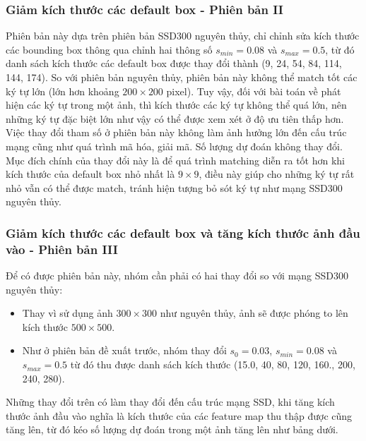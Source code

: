 \documentclass[a4paper,12pt]{article}
\begin{document}
	\subsubsection{Giảm kích thước các default box - Phiên bản II}
	
	Phiên bản này dựa trên phiên bản SSD300 nguyên thủy\cite{liu2016ssd}, chỉ chỉnh sửa kích thước các bounding box thông qua chỉnh hai thông số $s_{min} = 0.08$ và $s_{max} = 0.5$, từ đó danh sách kích thước các default box được thay đổi thành (9, 24, 54, 84, 114, 144, 174). So với phiên bản nguyên thủy, phiên bản này không thể match tốt các ký tự lớn (lớn hơn khoảng $200 \times 200$ pixel). Tuy vậy, đối với bài toán về phát hiện các ký tự trong một ảnh, thì kích thước các ký tự không thể quá lớn, nên những ký tự đặc biệt lớn như vậy có thể được xem xét ở độ ưu tiên thấp hơn.\\
	Việc thay đổi tham số ở phiên bản này không làm ảnh hưởng lớn đến cấu trúc mạng cũng như quá trình mã hóa, giải mã. Số lượng dự đoán không thay đổi.\\
	Mục đích chính của thay đổi này là để quá trình matching diễn ra tốt hơn khi kích thước của default box nhỏ nhất là $9 \times 9$, điều này giúp cho những ký tự rất nhỏ vẫn có thể được match, tránh hiện tượng bỏ sót ký tự như mạng SSD300 nguyên thủy\cite{liu2016ssd}.
	
	\subsubsection{Giảm kích thước các default box và tăng kích thước ảnh đầu vào - Phiên bản III}
	
	Để có được phiên bản này, nhóm cần phải có hai thay đổi so với mạng SSD300 nguyên thủy\cite{liu2016ssd}:
	\begin{itemize}
		\item Thay vì sử dụng ảnh $300 \times 300$ như nguyên thủy, ảnh sẽ được phóng to lên kích thước $500 \times 500$.
		\item Như ở phiên bản đề xuất trước, nhóm thay đổi $s_0 = 0.03$, $s_{min} = 0.08$ và $s_{max} = 0.5$ từ đó thu được danh sách kích thước (15.0, 40, 80, 120, 160., 200, 240, 280).
	\end{itemize}
	Những thay đổi trên có làm thay đổi đến cấu trúc mạng SSD\cite{liu2016ssd}, khi tăng kích thước ảnh đầu vào nghĩa là kích thước của các feature map thu thập được cũng tăng lên, từ đó kéo số lượng dự đoán trong một ảnh tăng lên như bảng dưới.\\
	
\end{document}
